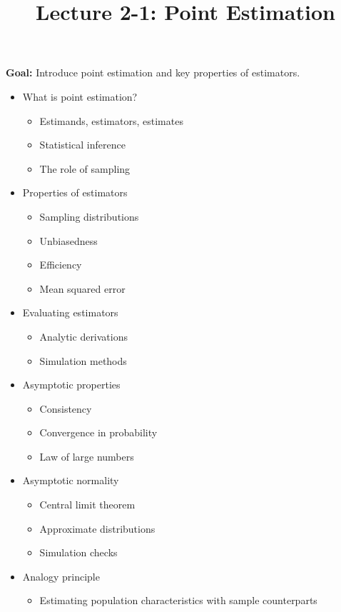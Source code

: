\documentclass[12pt]{article}
\title{\Large Lecture 2-1: Point Estimation}
\author{}
\date{}
\begin{document}
\maketitle
\vspace{-6em}

\noindent \textbf{Goal:} Introduce point estimation and key properties of estimators.\medskip

\begin{itemize}\setlength{\itemsep}{1em}
\item What is point estimation?
\begin{itemize}
\item Estimands, estimators, estimates
\item Statistical inference
\item The role of sampling
\end{itemize}
\item Properties of estimators
\begin{itemize}
\item Sampling distributions
\item Unbiasedness
\item Efficiency
\item Mean squared error
\end{itemize}
\item Evaluating estimators
\begin{itemize}
\item Analytic derivations
\item Simulation methods
\end{itemize}
\item Asymptotic properties
\begin{itemize}
\item Consistency
\item Convergence in probability
\item Law of large numbers
\end{itemize}
\item Asymptotic normality
\begin{itemize}
\item Central limit theorem
\item Approximate distributions
\item Simulation checks
\end{itemize}
\item Analogy principle
\begin{itemize}
\item Estimating population characteristics with sample counterparts
\end{itemize}
\end{itemize}
\end{document}
